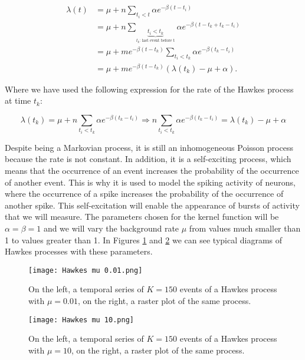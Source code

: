 \begin{equation}
    \begin{split}
        \lambda(t) &= \mu + n\sum_{t_i<t}\alpha e^{-\beta(t-t_i)}\\
        &= \mu + n\sum_{\underbrace{t_i<t_k}_{t_k\text{: last event before t}}}\alpha e^{-\beta(t-t_k+t_k-t_i)}\\
        &= \mu + me^{-\beta(t-t_k)}\sum_{t_i<t_k}\alpha e^{-\beta(t_k-t_i)}\\
        &= \mu + me^{-\beta(t-t_k)}\left( \lambda(t_k)-\mu+\alpha \right).
    \end{split}
    \label{eq: Hawkes rate exponential becomes Markovian}
\end{equation}

Where we have used the following expression for the rate of the Hawkes process at time $t_k$:

\begin{equation}
    \lambda(t_k) =\mu+n\sum_{t_i<t_k}\alpha e^{-\beta(t_k-t_i)}\Rightarrow n\sum_{t_i<t_k}\alpha e^{-\beta(t_k-t_i)} = \lambda(t_k)-\mu+\alpha
    \label{eq: Hawkes rate at event time}
\end{equation}

Despite being a Markovian process, it is still an inhomogeneous Poisson process because the rate is not constant. In addition, it is a self-exciting process, which means that the occurrence
of an event increases the probability of the occurrence of another event. This is why it is used to model the spiking activity of neurons, where the occurrence of a spike increases the
probability of the occurrence of another spike. This self-excitation will enable the appearance of bursts of activity that we will measure. The parameters chosen for the kernel function 
will be $\alpha=\beta=1$ and we will vary the background rate $\mu$ from values much smaller than 1 to values greater than 1. In Figures \ref{f: Hawkes rate} and \ref{f: Hawkes rate 2}
we can see typical diagrams of Hawkes processes with these parameters.

\begin{figure}[H]
    \centering
    \texttt{[image: Hawkes mu 0.01.png]}
    \caption{On the left, a temporal series of $K=150$ events of a Hawkes process with $\mu=0.01$, on the right, a raster plot of the same process.}
    \label{f: Hawkes rate}
\end{figure}

\begin{figure}[H]
    \centering
    \texttt{[image: Hawkes mu 10.png]}
    \caption{On the left, a temporal series of $K=150$ events of a Hawkes process with $\mu=10$, on the right, a raster plot of the same process.}
    \label{f: Hawkes rate 2}
\end{figure}

